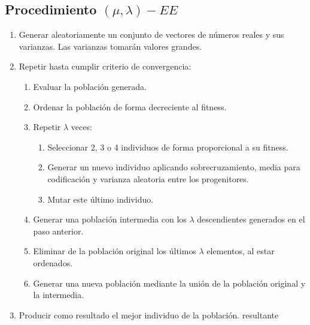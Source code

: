 \documentclass[12pt, twoside, openright]{report} %
\begin{document}
\subsection{Procedimiento $(\mu, \lambda)-EE$}
\begin{enumerate}
	\item Generar aleatoriamente un conjunto de vectores de números reales y sus varianzas. Las varianzas tomarán valores grandes.
	\item Repetir hasta cumplir criterio de convergencia:
	\begin{enumerate}
		\item Evaluar la población generada.
		\item Ordenar la población de forma decreciente al fitness.
		\item Repetir $\lambda$ veces:
		\begin{enumerate}
			\item Seleccionar 2, 3 o 4 individuos de forma proporcional a su fitness.
			\item Generar un nuevo individuo aplicando sobrecruzamiento, media para codificación y varianza aleatoria entre los progenitores.
			\item Mutar este último individuo.
		\end{enumerate}
		\pagebreak

		\item Generar una población intermedia con los $\lambda$ descendientes generados en el paso anterior.
		\item Eliminar de la población original los últimos $\lambda$ elementos, al estar ordenados.
		\item Generar una nueva población mediante la unión de la población original y la intermedia.
	\end{enumerate}
	\item Producir como resultado el mejor individuo de la población.
	resultante
\end{enumerate}
\end{document}
